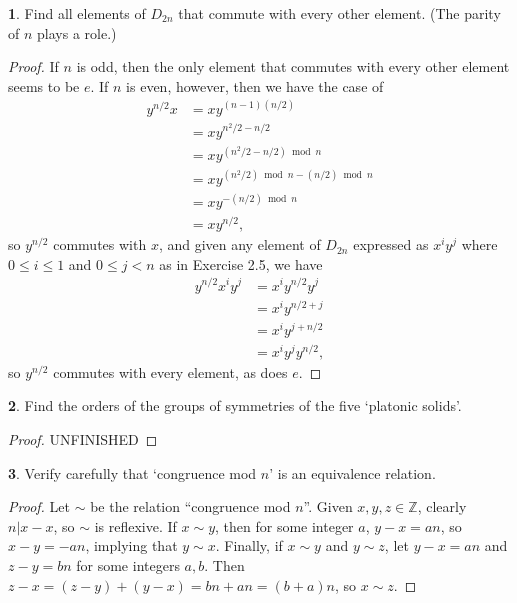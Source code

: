 \documentclass{article}
\theoremstyle{definition}
\newtheorem{ex}{}[section]
\begin{document}
\begin{ex}
	Find all elements of $D_{2n}$ that commute with every other element.
	(The parity of $n$ plays a role.)
\end{ex}
\begin{proof}
	If $n$ is odd, then the only element that commutes with every other element seems to be $e$.
	If $n$ is even, however, then we have the case of \begin{align*}
		y^{n / 2}x & = xy^{(n - 1) (n / 2)}                     \\
		           & = xy^{n^2 / 2 - n / 2}                     \\
		           & = xy^{(n^2 / 2 - n / 2) \bmod n}           \\
		           & = xy^{(n^2 / 2) \bmod n - (n / 2) \bmod n} \\
		           & = xy^{- (n / 2) \bmod n}                   \\
		           & = xy^{n / 2},
	\end{align*}
	so $y^{n / 2}$ commutes with $x$, and given any element of $D_{2n}$ expressed as $x^iy^j$ where $0 \leq i \leq 1$ and $0 \leq j < n$ as in Exercise 2.5, we have \begin{align*}
		y^{n / 2}x^iy^j & = x^iy^{n / 2}y^j  \\
		                & = x^iy^{n / 2 + j} \\
		                & = x^iy^{j + n / 2} \\
		                & = x^iy^jy^{n / 2},
	\end{align*}
	so $y^{n/2}$ commutes with every element, as does $e$.
\end{proof}

\begin{ex}
	Find the orders of the groups of symmetries of the five `platonic solids'.
\end{ex}
\begin{proof}
	UNFINISHED
\end{proof}

\begin{ex}
	Verify carefully that `congruence mod $n$' is an equivalence relation.
\end{ex}
\begin{proof}
	Let $\sim$ be the relation ``congruence mod $n$''.
	Given $x, y, z \in \mathbb{Z}$, clearly $n | x - x$, so $\sim$ is reflexive.
	If $x \sim y$, then for some integer $a$, $y - x = an$, so $x - y = -an$, implying that $y \sim x$.
	Finally, if $x \sim y$ and $y \sim z$, let $y - x = an$ and $z - y = bn$ for some integers $a, b$.
	Then $z - x = (z - y) + (y - x) = bn + an = (b + a)n$, so $x \sim z$.
\end{proof}
\end{document}
